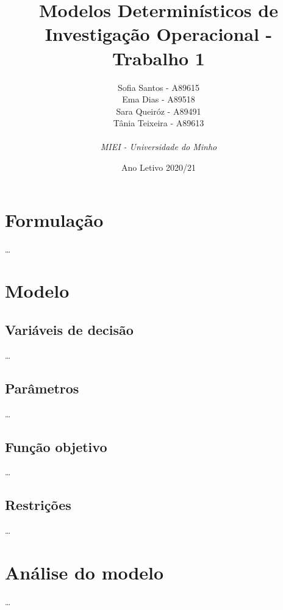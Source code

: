 \documentclass{article}
\begin{document}
\title{Modelos Determinísticos de Investigação Operacional - Trabalho 1}
\author{Sofia Santos - A89615 \\ Ema Dias - A89518 \\
    Sara Queiróz - A89491 \\ Tânia Teixeira - A89613 \\\\
    {\centering\emph{MIEI - Universidade do Minho}}}

\date{Ano Letivo 2020/21}    

\maketitle

\section{Formulação}

\dots

\section{Modelo}

\subsection{Variáveis de decisão}

\dots

\subsection{Parâmetros}

\dots

\subsection{Função objetivo}

\dots

\subsection{Restrições}

\dots

\section{Análise do modelo}

\dots
\end{document}
